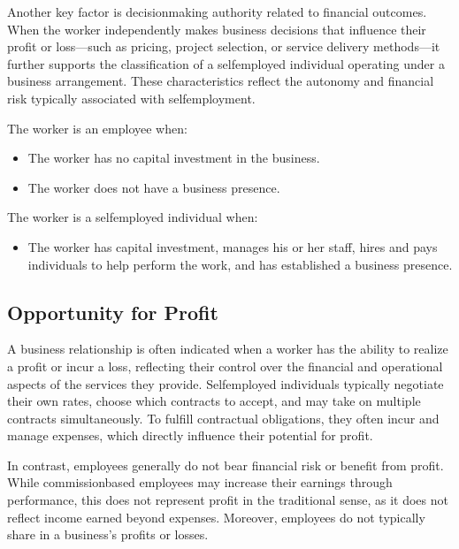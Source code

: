 \documentclass[letterpaper,10pt,english]{sphinxmanual}
\begin{document}
\sphinxAtStartPar
Another key factor is decision\sphinxhyphen{}making authority related to financial outcomes. When the worker independently makes business
decisions that influence their profit or loss—such as pricing, project selection, or service delivery methods—it further
supports the classification of a self\sphinxhyphen{}employed individual operating under a business arrangement. These characteristics
reflect the autonomy and financial risk typically associated with self\sphinxhyphen{}employment.

\sphinxAtStartPar
The worker is an employee when:
\begin{itemize}
\item {} 
\sphinxAtStartPar
The worker has no capital investment in the business.

\item {} 
\sphinxAtStartPar
The worker does not have a business presence.

\end{itemize}

\sphinxAtStartPar
The worker is a self\sphinxhyphen{}employed individual when:
\begin{itemize}
\item {} 
\sphinxAtStartPar
The worker has capital investment, manages his or her staff, hires and pays individuals to help perform the work, and has established a business presence.

\end{itemize}


\subsection{Opportunity for Profit}
\label{\detokenize{3_contracts:opportunity-for-profit}}
\sphinxAtStartPar
A business relationship is often indicated when a worker has the ability to realize a profit or incur a loss, reflecting their
control over the financial and operational aspects of the services they provide. Self\sphinxhyphen{}employed individuals typically
negotiate their own rates, choose which contracts to accept, and may take on multiple contracts simultaneously. To fulfill
contractual obligations, they often incur and manage expenses, which directly influence their potential for profit.

\sphinxAtStartPar
In contrast, employees generally do not bear financial risk or benefit from profit. While commission\sphinxhyphen{}based employees may
increase their earnings through performance, this does not represent profit in the traditional sense, as it does not reflect
income earned beyond expenses. Moreover, employees do not typically share in a business’s profits or losses.
\end{document}
